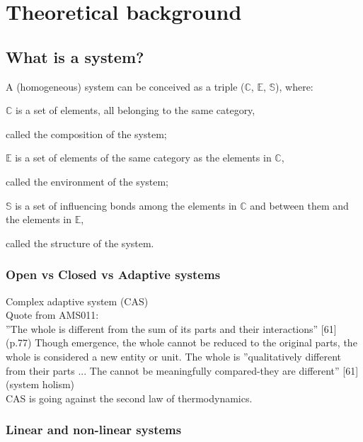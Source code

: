 \chapter{Theoretical background}
\label{ch:theoreticalbackground}

\section{What is a system?}
\label{sec:tbsystem}

\textcite[p. 162]{Dietz2020}

A (homogeneous) system can be conceived as a triple ($\mathbb{C}$, $\mathbb{E}$, $\mathbb{S}$), where: \bigskip

\noindent $\mathbb{C}$ is a set of elements, all belonging to the same category,

\indent called the composition of the system;\bigskip

\noindent $\mathbb{E}$ is a set of elements of the same category as the elements in $\mathbb{C}$,

\indent called the environment of the system;\bigskip

\noindent $\mathbb{S}$ is a set of influencing bonds among the elements in $\mathbb{C}$ and between them and the elements in $\mathbb{E}$,

\indent called the structure of the system.


\subsection{Open vs Closed vs Adaptive systems}
\label{sub:tbopenclosedadaptivesystems}
Complex adaptive system (CAS)\\

Quote from AMS011: \parencite{Turner2019}\\
''The whole is different from the sum of its parts and their interactions'' [61] (p.77) Though emergence, the whole cannot be reduced to the original parts, the whole is considered a new entity or unit. The whole is ''qualitatively different from their parts ... The cannot be meaningfully compared-they are different'' [61] (system holism)\\
CAS is going against the second law of thermodynamics.\\

\subsection{Linear and non-linear systems}
\label{sub:linearnonlinear}



